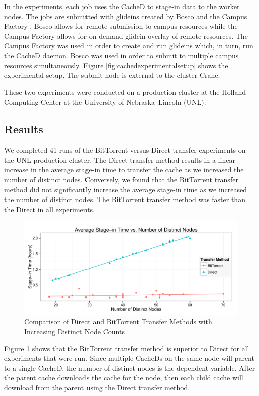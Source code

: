 In the experiments, each job uses the CacheD to stage-in data to the worker nodes.  The jobs are submitted with glideins created by Bosco \cite{weitzel2014accessing}  and the Campus Factory \cite{weitzel2011campus}.  Bosco allows for remote submission to campus resources while the Campus Factory allows for on-demand glidein overlay of remote resources.  The Campus Factory was used in order to create and run glideins which, in turn, run the CacheD daemon.  Bosco was used in order to submit to multiple campus resources simultaneously.  Figure \ref{fig:cachedexperimentalsetup} shows the experimental setup.  The submit node is external to the cluster Crane.

These two experiments were conducted on a production cluster at the Holland Computing Center at the University of Nebraska--Lincoln (UNL).

\subsection{Results}

We completed 41 runs of the BitTorrent versus Direct transfer  experiments on the UNL production cluster.  The Direct transfer method results in a linear increase in the average stage-in time to transfer the cache as we increased the number of distinct nodes.  Conversely, we found that the BitTorrent transfer method did not significantly increase the average stage-in time as we increased the number of distinct nodes.  The BitTorrent transfer method was faster than the Direct in all experiments.


\begin{figure}[h!t]
\centering
\includegraphics[width=\textwidth]{images/CombinedPlot.pdf}
\caption{Comparison of Direct and BitTorrent Transfer Methods with Increasing Distinct Node Counts}
\label{fig:combinedgraph}
\end{figure}

Figure \ref{fig:combinedgraph} shows that the BitTorrent transfer method is superior to Direct for all experiments that were run.  Since multiple CacheDs on the same node will parent to a single CacheD, the number of distinct nodes is the dependent variable.  After the parent cache downloads the cache for the node, then each child cache will download from the parent using the Direct transfer method.

